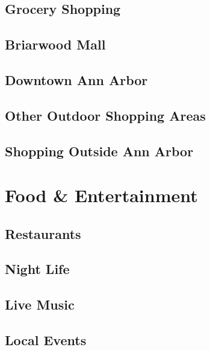 \documentclass[
]{book}
\begin{document}
\hypertarget{grocery-shopping}{%
\section{Grocery Shopping}\label{grocery-shopping}}

\hypertarget{briarwood-mall}{%
\section{Briarwood Mall}\label{briarwood-mall}}

\hypertarget{downtown-ann-arbor}{%
\section{Downtown Ann Arbor}\label{downtown-ann-arbor}}

\hypertarget{other-outdoor-shopping-areas}{%
\section{Other Outdoor Shopping Areas}\label{other-outdoor-shopping-areas}}

\hypertarget{shopping-outside-ann-arbor}{%
\section{Shopping Outside Ann Arbor}\label{shopping-outside-ann-arbor}}

\hypertarget{food-entertainment}{%
\chapter{Food \& Entertainment}\label{food-entertainment}}

\hypertarget{restaurants}{%
\section{Restaurants}\label{restaurants}}

\hypertarget{night-life}{%
\section{Night Life}\label{night-life}}

\hypertarget{live-music}{%
\section{Live Music}\label{live-music}}

\hypertarget{local-events}{%
\section{Local Events}\label{local-events}}
\end{document}
